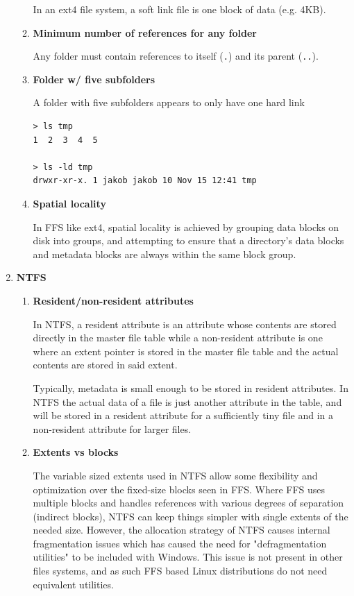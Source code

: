 \documentclass{article}
\begin{document}
\begin{enumerate}
\begin{enumerate}
                    In an ext4 file system, a soft link file is one block of data (e.g. 4KB).

              \item \textbf{Minimum number of references for any folder}

                    Any folder must contain references to itself (\verb+.+) and its parent (\verb+..+).
              \item \textbf{Folder w/ five subfolders}

                    A folder with five subfolders appears to only have one hard link
                    \begin{verbatim}
> ls tmp
1  2  3  4  5

> ls -ld tmp
drwxr-xr-x. 1 jakob jakob 10 Nov 15 12:41 tmp
                \end{verbatim}
              \item \textbf{Spatial locality}

                    In FFS like ext4, spatial locality is achieved by grouping data blocks on disk into groups, and attempting to ensure that a directory's data blocks and metadata blocks are always within the same block group.

          \end{enumerate}
    \item \textbf{NTFS}
          \begin{enumerate}
              \item \textbf{Resident/non-resident attributes}

                    In NTFS, a resident attribute is an attribute whose contents are stored directly in the master file table while a non-resident attribute is one where an extent pointer is stored in the master file table and the actual contents are stored in said extent.

                    Typically, metadata is small enough to be stored in resident attributes. In NTFS the actual data of a file is just another attribute in the table, and will be stored in a resident attribute for a sufficiently tiny file and in a non-resident attribute for larger files.

              \item \textbf{Extents vs blocks}

                    The variable sized extents used in NTFS allow some flexibility and optimization over the fixed-size blocks seen in FFS. Where FFS uses multiple blocks and handles references with various degrees of separation (indirect blocks), NTFS can keep things simpler with single extents of the needed size. However, the allocation strategy of NTFS causes internal fragmentation issues which has caused the need for "defragmentation utilities" to be included with Windows. This issue is not present in other files systems, and as such FFS based Linux distributions do not need equivalent utilities.
          \end{enumerate}


\end{enumerate}
\end{document}
